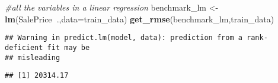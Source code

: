 \documentclass[]{article}
\newenvironment{Shaded}{\begin{snugshade}}{\end{snugshade}}
\newcommand{\CommentTok}[1]{\textcolor[rgb]{0.56,0.35,0.01}{\textit{#1}}}
\newcommand{\DataTypeTok}[1]{\textcolor[rgb]{0.13,0.29,0.53}{#1}}
\newcommand{\KeywordTok}[1]{\textcolor[rgb]{0.13,0.29,0.53}{\textbf{#1}}}
\newcommand{\NormalTok}[1]{#1}
\newcommand{\OperatorTok}[1]{\textcolor[rgb]{0.81,0.36,0.00}{\textbf{#1}}}
\newcommand{\StringTok}[1]{\textcolor[rgb]{0.31,0.60,0.02}{#1}}
\begin{document}
\begin{Shaded}
\begin{Highlighting}[]
\CommentTok{#all the variables in a linear regression}
\NormalTok{benchmark_lm <-}\StringTok{ }\KeywordTok{lm}\NormalTok{(SalePrice}\OperatorTok{~}\NormalTok{.,}\DataTypeTok{data=}\NormalTok{train_data)}
\KeywordTok{get_rmse}\NormalTok{(benchmark_lm,train_data)}
\end{Highlighting}
\end{Shaded}

\begin{verbatim}
## Warning in predict.lm(model, data): prediction from a rank-deficient fit may be
## misleading
\end{verbatim}

\begin{verbatim}
## [1] 20314.17
\end{verbatim}
\end{document}
